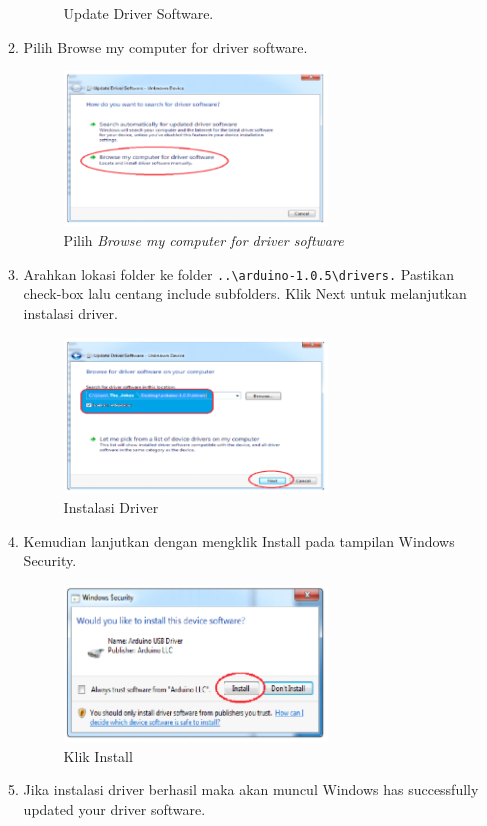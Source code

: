 \begin{enumerate}
\begin{enumerate}
\begin{figure}[ht]
				\caption{Update Driver Software.}
		\end{figure}
		\item Pilih Browse my computer for driver software.
		\begin{figure}[ht]
				\includegraphics[width=7cm]{figures/5/1174087/Teori/7.png}
				\centering
				\caption{Pilih \textit{Browse my computer for driver software}}
		\end{figure}
		\item Arahkan lokasi folder ke folder \verb|..\arduino-1.0.5\drivers.| Pastikan check-box lalu centang include subfolders. Klik Next untuk melanjutkan instalasi driver.
		\begin{figure}[ht]
				\includegraphics[width=7cm]{figures/5/1174087/Teori/8.png}
				\centering
				\caption{Instalasi Driver}
		\end{figure}
		\item Kemudian lanjutkan dengan mengklik Install pada tampilan Windows Security.
		\begin{figure}[ht]
				\includegraphics[width=7cm]{figures/5/1174087/Teori/9.png}
				\centering
				\caption{Klik Install}
		\end{figure}
		\item  Jika instalasi driver berhasil maka akan muncul Windows has successfully updated your driver software.

\end{enumerate}
\end{enumerate}
